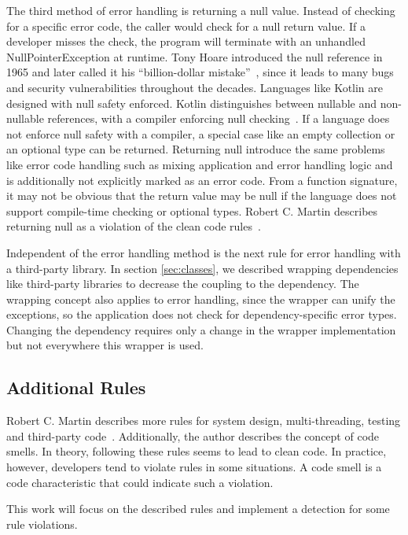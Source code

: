 The third method of error handling is returning a null value. Instead of checking for a specific error code, the caller would check for a null return value. If a developer misses the check, the program will terminate with an unhandled NullPointerException at runtime. Tony Hoare introduced the null reference in 1965 and later called it his \enquote{billion-dollar mistake}~\cite{hoare_null_2009}, since it leads to many bugs and security vulnerabilities throughout the decades. Languages like Kotlin are designed with null safety enforced. Kotlin distinguishes between nullable and non-nullable references, with a compiler enforcing null checking~\cite{noauthor_null_nodate}. If a language does not enforce null safety with a compiler, a special case like an empty collection or an optional type can be returned. 
Returning null introduce the same problems like error code handling such as mixing application and error handling logic and is additionally not explicitly marked as an error code. From a function signature, it may not be obvious that the return value may be null if the language does not support compile-time checking or optional types. Robert C. Martin describes returning null as a violation of the clean code rules~\cite{martin_clean_2009}. 

Independent of the error handling method is the next rule for error handling with a third-party library. In section \ref{sec:classes}, we described wrapping dependencies like third-party libraries to decrease the coupling to the dependency. The wrapping concept also applies to error handling, since the wrapper can unify the exceptions, so the application does not check for dependency-specific error types. Changing the dependency requires only a change in the wrapper implementation but not everywhere this wrapper is used. 

\subsection{Additional Rules}
Robert C. Martin describes more rules for system design, multi-threading, testing and third-party code~\cite{martin_clean_2009}. 
Additionally, the author describes the concept of code smells. In theory, following these rules seems to lead to clean code. In practice, however, developers tend to violate rules in some situations. A code smell is a code characteristic that could indicate such a violation.

This work will focus on the described rules and implement a detection for some rule violations.

